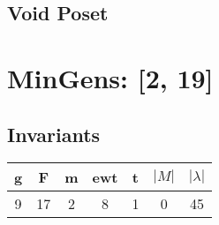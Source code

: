 \documentclass[a4paper]{article}
\begin{document}
\hfill\begin{minipage}{0.48\textwidth}
\subsection*{Void Poset}
\centering
\end{minipage}
\newpage\section{MinGens: [2, 19]}
\noindent\begin{minipage}{0.6\textwidth}
\subsection*{Invariants}
\centering
\begin{tabular}{|c|c|c|c|c|c|c|}
\toprule
g & F & m & ewt & t & \(|M|\) & \(|\lambda|\) \\
\midrule
9 & 17 & 2 & 8 & 1 & 0 & 45 \\
\bottomrule
\end{tabular}
\end{minipage}%
\end{document}
